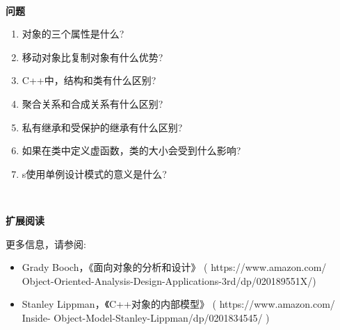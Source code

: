 \noindent\textbf{}\ \par
\textbf{问题} \ \par
\begin{enumerate}
	\item 对象的三个属性是什么?
	\item 移动对象比复制对象有什么优势?
	\item C++中，结构和类有什么区别?
	\item 聚合关系和合成关系有什么区别?
	\item 私有继承和受保护的继承有什么区别?
	\item 如果在类中定义虚函数，类的大小会受到什么影响?
	\item s使用单例设计模式的意义是什么?
\end{enumerate}

\noindent\textbf{}\ \par
\textbf{扩展阅读} \ \par
更多信息，请参阅: \par

\begin{itemize}
	\item Grady Booch，《面向对象的分析和设计》 ( https:/​/​www.​amazon.​com/	Object-​Oriented-​Analysis-​Design-​Applications-​3rd/​dp/​020189551X/​ )
	\item Stanley Lippman，《C++对象的内部模型》 ( https:/​/​www.​amazon.​com/​Inside-	Object-​Model-​Stanley-​Lippman/​dp/​0201834545/​ )
\end{itemize}

\newpage




















